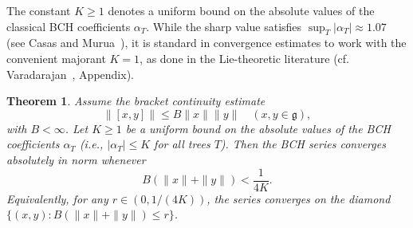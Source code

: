 \documentclass[11pt]{amsart}
\numberwithin{equation}{section}
\newtheorem{theorem}{Theorem}[section]
\theoremstyle{remark}
\begin{document}
The constant \( K \geq 1 \) denotes a uniform bound on the absolute values of the classical BCH coefficients \( \alpha_T \). While the sharp value satisfies \( \sup_T |\alpha_T| \approx 1.07 \) (see Casas and Murua~\cite{CasasMurua2009}), it is standard in convergence estimates to work with the convenient majorant \( K = 1 \), as done in the Lie-theoretic literature (cf. Varadarajan~\cite{Varadarajan1984}, Appendix).
\begin{theorem}\label{thm:general-BCH}
Assume the bracket continuity estimate
\[
\|[x, y]\| \leq B \|x\| \|y\| \quad (x, y \in \mathfrak{g}),
\]
with $B < \infty$. Let $K \geq 1$ be a uniform bound on the absolute values of the BCH coefficients $\alpha_T$ (i.e., $|\alpha_T| \leq K$ for all trees $T$). Then the BCH series converges absolutely in norm whenever
\[
B(\|x\| + \|y\|) < \frac{1}{4K}.
\]
Equivalently, for any $r \in (0, 1/(4K))$, the series converges on the diamond $\{(x, y): B(\|x\| + \|y\|) \leq r\}$.
\end{theorem}
\end{document}
